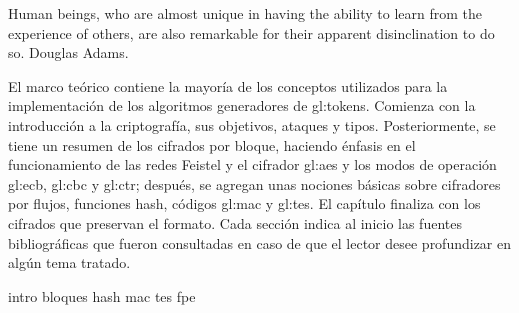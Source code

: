 %
%

\label{sec:marco_teorico}
{%
  Human beings, who are almost unique in having the ability to learn from the
  experience of others, are also remarkable for their apparent disinclination
  to do so.%
}
{%
   Douglas Adams.%
}

\noindent
El marco teórico contiene la mayoría de los conceptos utilizados para la
implementación de los algoritmos generadores de \glspl{gl:token}. Comienza con
la introducción a la criptografía, sus objetivos, ataques y tipos.
Posteriormente, se tiene un resumen de los cifrados por bloque, haciendo énfasis
en el funcionamiento de las redes Feistel y el cifrador \gls{gl:aes} y los modos
de operación \gls{gl:ecb}, \gls{gl:cbc} y \gls{gl:ctr}; después, se agregan unas
nociones básicas sobre cifradores por flujos, funciones hash, códigos
\gls{gl:mac} y \gls{gl:tes}. El capítulo finaliza con los cifrados que preservan
el formato. Cada sección indica al inicio las fuentes bibliográficas que fueron
consultadas en caso de que el lector desee profundizar en algún tema tratado.

{intro}
{bloques}
{hash}
{mac}
{tes}
{fpe}
